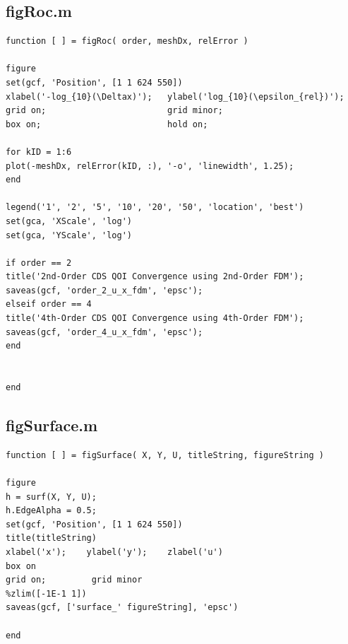 \documentclass[10pt]{article}		%
\numberwithin{equation}{section}
\begin{document}
\subsection{figRoc.m}

\begin{lstlisting}
function [ ] = figRoc( order, meshDx, relError )

figure
set(gcf, 'Position', [1 1 624 550])
xlabel('-log_{10}(\Deltax)');   ylabel('log_{10}(\epsilon_{rel})');
grid on;                        grid minor;
box on;                         hold on;

for kID = 1:6
plot(-meshDx, relError(kID, :), '-o', 'linewidth', 1.25);
end

legend('1', '2', '5', '10', '20', '50', 'location', 'best')
set(gca, 'XScale', 'log')
set(gca, 'YScale', 'log')

if order == 2
title('2nd-Order CDS QOI Convergence using 2nd-Order FDM');
saveas(gcf, 'order_2_u_x_fdm', 'epsc');
elseif order == 4
title('4th-Order CDS QOI Convergence using 4th-Order FDM');
saveas(gcf, 'order_4_u_x_fdm', 'epsc');
end


end
\end{lstlisting}

\subsection{figSurface.m}

\begin{lstlisting}
function [ ] = figSurface( X, Y, U, titleString, figureString )

figure
h = surf(X, Y, U);
h.EdgeAlpha = 0.5;
set(gcf, 'Position', [1 1 624 550])
title(titleString)
xlabel('x');    ylabel('y');    zlabel('u')
box on
grid on;         grid minor
%zlim([-1E-1 1])
saveas(gcf, ['surface_' figureString], 'epsc')

end
\end{lstlisting}
\end{document}

